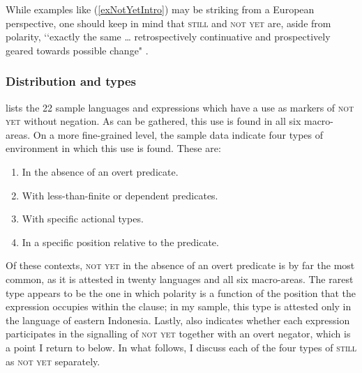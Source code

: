 While examples like (\ref{exNotYetIntro}) may be striking from a European perspective, one should keep in mind that \textsc{still} and \textsc{not yet} are, 
aside from polarity, \lq\lq exactly the same … retrospectively continuative and prospectively geared towards possible change" \parencite[40]{vanderAuwera1998}.

\subsubsection{Distribution and types}
 lists the 22 sample languages and expressions which have a use as markers of \textsc{not yet} without negation. As can be gathered, this use is found in all six macro-areas. On a more fine-grained level, the sample data indicate four types of environment in which this use is found. These are:

\begin{enumerate}[label=(\roman*)]
	\item In the absence of an overt predicate.
	\item With less-than-finite or dependent predicates.
	\item With specific actional types.
	\item In a specific position relative to the predicate.\label{typeNotYet4}
\end{enumerate}

Of these contexts, \textsc{not yet} in the absence of an overt predicate is by far the most common, as it is attested in twenty languages and all six macro-areas. The rarest type appears to be the one in which polarity is a function of the position that the expression occupies within the clause; in my sample, this type is attested only in the  language of eastern Indonesia. Lastly,  also indicates whether each expression participates in the signalling of \textsc{not yet} together with an overt negator, which is a point I return to below. In what follows, I discuss each of the four types of \textsc{still} as \textsc{not yet} separately.

